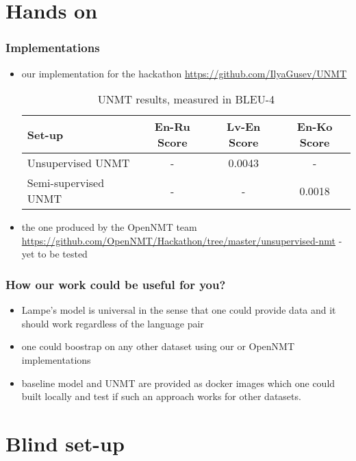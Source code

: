 \documentclass{beamer}
\begin{document}
\section{Hands on}

\begin{frame}
\frametitle{Implementations}

\begin{itemize}
\item our implementation for the hackathon \url{https://github.com/IlyaGusev/UNMT}
\begin{table}
\begin{tabular}{l c c c}
\toprule
Set-up & En-Ru Score & Lv-En Score & En-Ko Score\\
\midrule
Unsupervised UNMT & - & 0.0043 & - \\
Semi-supervised UNMT & - & - & 0.0018 \\
\bottomrule
\end{tabular}
\caption{UNMT results, measured in BLEU-4}
\end{table}
\item<2> the one produced by the OpenNMT team \url{https://github.com/OpenNMT/Hackathon/tree/master/unsupervised-nmt} - yet to be tested
\end{itemize}
\end{frame}

\begin{frame}
\frametitle{How our work could be useful for you?}

\begin{itemize}
\item Lampe's model is universal in the sense that one could provide data and it should work regardless of the language pair
\item one could boostrap on any other dataset using our or OpenNMT implementations
\item baseline model and UNMT are provided as docker images which one could built locally and test if such an approach works for other datasets.
\end{itemize}

\end{frame}

\section{Blind set-up}
\end{document}
